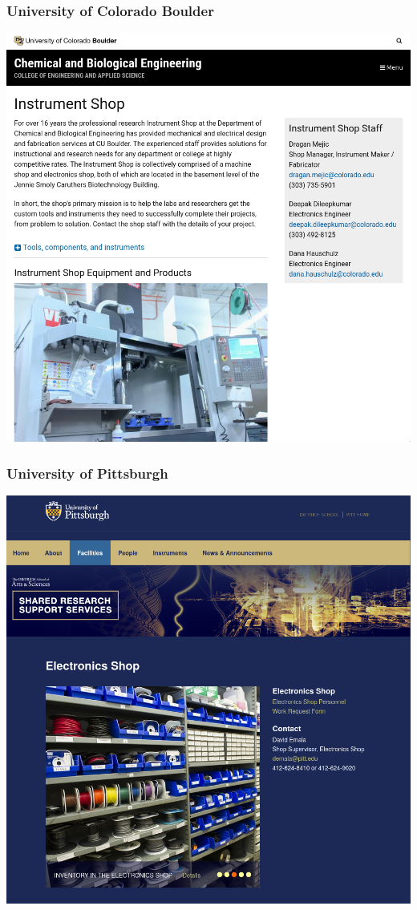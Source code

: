 \documentclass{presentation}
\begin{document}
{\begin{frame}\frametitle{University of Colorado Boulder}
  \includegraphics[width=\textwidth]{"./cu-boulder.png"}
\end{frame}

\begin{frame}\frametitle{University of Pittsburgh}
  \includegraphics[width=\textwidth]{"./pittsburgh.png"}
\end{frame}

}
\end{document}
